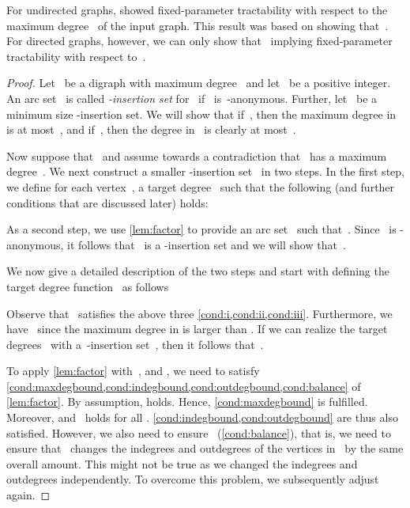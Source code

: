 \documentclass[a4paper,11pt]{article}
\theoremstyle{remark}
\theoremstyle{plain}
\newtheorem{lemma}[theorem]{Lemma}
\theoremstyle{definition}
\begin{document}
For undirected graphs, \citet{HNNS15} showed fixed-parameter tractability with respect to the maximum degree~ of the input graph.
This result was based on showing that~.
For directed graphs, however, we can only show that~ implying fixed-parameter tractability with respect to~.


\begin{proof}
 Let~ be a digraph with maximum degree~ and let~ be a positive integer.
 An arc set~ is called \emph{-insertion set} for~ if~ is~-anonymous.
 Further, let~ be a minimum size -insertion set. We will show that if~, then the maximum degree in~ is at most~, and
 if~, then the degree in~ is clearly at most~.
	
Now suppose that~ and assume towards a contradiction that~ has a maximum degree~.
We next construct a smaller -insertion set~ in two steps.
In the first step, we define for each vertex~, a target degree~ such that the following (and further conditions that are discussed later) holds:
	\begin{enumerate}[(a)]
		\item\label[cond]{cond:i} ,
		\item\label[cond]{cond:ii} , and
		\item\label[cond]{cond:iii} the multiset~ is -anonymous, that is~ for each~.
	\end{enumerate}
	As a second step, we use \cref{lem:factor} to provide an arc set~ such that~.
	Since~ is -anonymous, it follows that~ is a -insertion set and we will show that~. 

	We now give a detailed description of the two steps and start with defining the target degree function~ as follows
	
	Observe that~ satisfies the above three \cref{cond:i,cond:ii,cond:iii}. 
	Furthermore, we have~ since the maximum degree in  is larger than .
	If we can realize the target degrees~ with a~-insertion set~, then it follows that~.
	
	To apply \cref{lem:factor} with~,  and , we need to satisfy \cref{cond:maxdegbound,cond:indegbound,cond:outdegbound,cond:balance} of \cref{lem:factor}.
	By assumption,  holds.
	Hence, \cref{cond:maxdegbound} is fulfilled.
	Moreover,  and~ holds for all .
	\cref{cond:indegbound,cond:outdegbound} are thus also satisfied.
	However, we also need to ensure~ (\cref{cond:balance}), that is, we need to ensure that~ changes the indegrees and outdegrees of the vertices in~ by the same overall amount.
	This might not be true as we changed the indegrees and outdegrees independently.
	To overcome this problem, we subsequently adjust~ again.
	

\end{proof}
\end{document}
